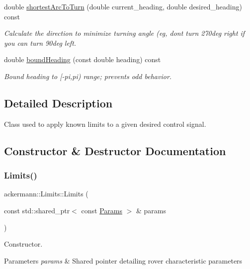 \begin{DoxyCompactItemize}
double \hyperlink{classackermann_1_1_limits_a7fb25c558450b31945d1b13db4573a08}{shortest\+Arc\+To\+Turn} (double current\+\_\+heading, double desired\+\_\+heading) const
\begin{DoxyCompactList}\small\item\em Calculate the direction to minimize turning angle (eg, don\textquotesingle{}t turn 270deg right if you can turn 90deg left. \end{DoxyCompactList}\item 
double \hyperlink{classackermann_1_1_limits_a18e0ace6fde91bf5b641197dafbd5f57}{bound\+Heading} (const double heading) const
\begin{DoxyCompactList}\small\item\em Bound heading to \mbox{[}-\/pi,pi) range; prevents odd behavior. \end{DoxyCompactList}\end{DoxyCompactItemize}


\subsection{Detailed Description}
Class used to apply known limits to a given desired control signal. 

\subsection{Constructor \& Destructor Documentation}
\mbox{\label{classackermann_1_1_limits_ab33a83c243c38ae9f046c77d49a6de58}} 
\subsubsection{\texorpdfstring{Limits()}{Limits()}}
{\footnotesize\ttfamily ackermann\+::\+Limits\+::\+Limits (\begin{DoxyParamCaption}\item[{const std\+::shared\+\_\+ptr$<$ const \hyperlink{structackermann_1_1_params}{Params} $>$ \&}]{params }\end{DoxyParamCaption})\hspace{0.3cm}{\ttfamily [explicit]}}



Constructor. 


\begin{DoxyParams}{Parameters}
{\em params} & Shared pointer detailing rover characteristic parameters \\
\hline
\end{DoxyParams}


